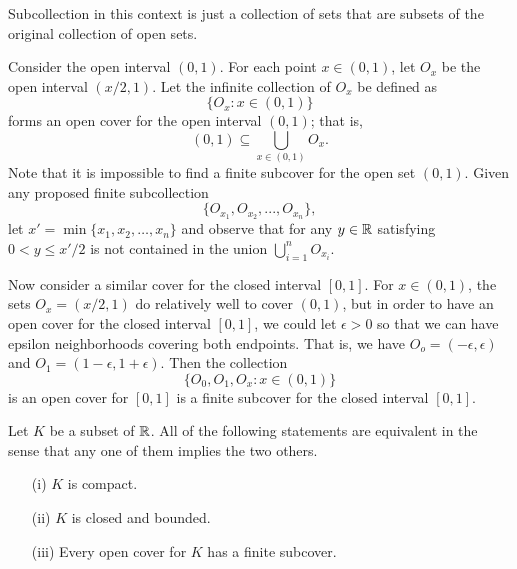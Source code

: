 Subcollection in this context is just a collection of sets that are subsets of the original collection of open sets.

Consider the open interval \( (0,1) \). For each point \( x \in (0,1) \), let \( O_x \) be the open interval \( (x/2, 1) \). Let the infinite collection of \( O_x \) be defined as 
\[ \{ O_{x} : x \in (0,1) \}  \]
forms an open cover for the open interval \( (0,1) \); that is, 
\[  (0,1) \subseteq \bigcup_{ x \in (0,1) } O_x.  \]
Note that it is impossible to find a finite subcover for the open set \( (0,1) \). Given any proposed finite subcollection 
\[ \{ O_{x_1}, O_{x_2}, ..., O_{x_n} \}, \]
let \( x' = \min \{ x_1, x_2, \dots, x_n \}  \) and observe that for any \( y \in \mathbb{R}  \) satisfying \( 0 < y \leq x' /2  \) is not contained in the union \( \bigcup_{ i=1 }^{ n } O_{x_i} \). 

Now consider a similar cover for the closed interval \( [0,1] \). For \( x \in (0,1) \), the sets \( O_x = (x/2, 1) \) do relatively well to cover \( (0,1) \), but in order to have an open cover for the closed interval \( [0,1] \), we could let \( \epsilon > 0   \) so that we can have epsilon neighborhoods covering both endpoints. That is, we have \( O_o = (-\epsilon , \epsilon ) \) and \( O_1 = (1 - \epsilon, 1 + \epsilon ) \). Then the collection 
\[ \{ O_0, O_1, O_x : x \in (0,1) \}  \]
is an open cover for \( [0,1] \) is a finite subcover for the closed interval \( [0,1] \).

\begin{theorem}
Let \( K \) be a subset of \( \mathbb{R} \). All of the following statements are equivalent in the sense that any one of them implies the two others. 
\begin{enumerate}
    \item[(i)] \( K \) is compact.
    \item[(ii)] \( K \) is closed and bounded.
    \item[(iii)] Every open cover for \( K \) has a finite subcover.
\end{enumerate}
\end{theorem}%

